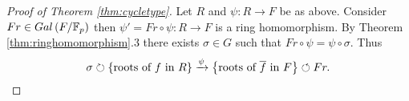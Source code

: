 \begin{proof}[Proof of Theorem \ref{thm:cycletype}]
Let $ R $ and $ \psi : R \to F $ be as above. Consider $ Fr \in Gal\left( F / \mathbb{F}_p \right) $ then $ \psi' = Fr \circ \psi : R \to F $ is a ring homomorphism. By Theorem \ref{thm:ringhomomorphism}.$ 3 $ there exists $ \sigma \in G $ such that $ Fr \circ \psi = \psi \circ \sigma $. Thus
$$ \sigma \circlearrowright \left\{ \text{roots of} \ f \ \text{in} \ R \right\} \xrightarrow{\psi} \left\{ \text{roots of} \ \overline{f} \ \text{in} \ F \right\} \circlearrowleft Fr. $$
\end{proof}

